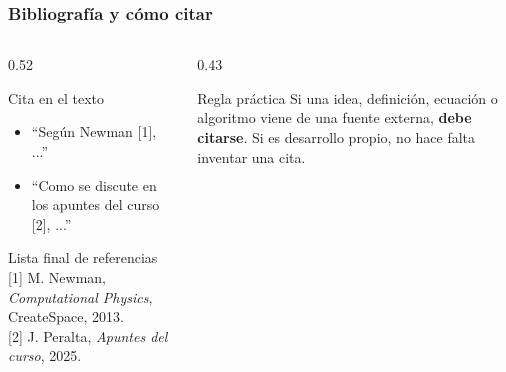 \begin{frame}
\frametitle{Bibliograf\'ia y c\'omo citar}
\begin{columns}[T]
\begin{column}{0.52\textwidth}
\begin{block}{Cita en el texto}
\begin{itemize}
    \item ``Seg\'un Newman [1], ...''
    \item ``Como se discute en los apuntes del curso [2], ...''
\end{itemize}
\end{block}

\begin{block}{Lista final de referencias}
\small
[1] M. Newman, \textit{Computational Physics}, CreateSpace, 2013.\\[0.1cm]
[2] J. Peralta, \textit{Apuntes del curso}, 2025.
\end{block}
\end{column}
\begin{column}{0.43\textwidth}
\begin{alertblock}{Regla pr\'actica}
Si una idea, definici\'on, ecuaci\'on o algoritmo viene de una fuente externa, \textbf{debe citarse}.\newline
\newline
Si es desarrollo propio, no hace falta inventar una cita.
\end{alertblock}
\end{column}
\end{columns}
\end{frame}

